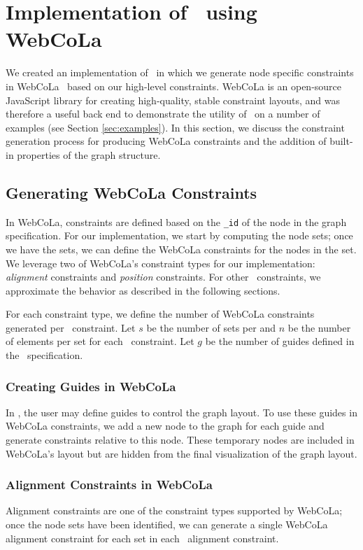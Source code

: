 \section{Implementation of \projectname~using WebCoLa}
We created an implementation of \projectname\ in which we generate node
specific constraints in WebCoLa~\cite{WebCoLa} based on our high-level
constraints. WebCoLa is an open-source JavaScript library for
creating high-quality, stable constraint layouts, and was therefore a
useful back end to demonstrate the utility of \projectname\ on a number of
examples (see Section \ref{sec:examples}). In this section, we discuss the
constraint generation process for producing WebCoLa constraints and the 
addition of built-in properties of the graph structure.

\subsection{Generating WebCoLa Constraints}
In WebCoLa, constraints are defined based on the \texttt{\_id} of the
node in the graph specification. For our implementation, we start by
computing the node sets; once we have the sets, we can define the WebCoLa
constraints for the nodes in the set. We leverage two of WebCoLa's
constraint types for our implementation: \emph{alignment} constraints 
and \emph{position} constraints. For other \projectname\ constraints, we
approximate the behavior as described in the following sections.

For each constraint type, we define the number of WebCoLa constraints
generated per \projectname\ constraint. Let $s$ be the number of sets per 
and $n$ be the number of elements per set for each \projectname\ constraint.
Let $g$ be the number of guides defined in the \projectname\ specification.

\subsubsection{Creating Guides in WebCoLa}
In \projectname, the user may define guides to control the graph layout.
To use these guides in WebCoLa constraints, we add a new node to the graph
for each guide and generate constraints relative to this node. These 
temporary nodes are included in WebCoLa's layout but are hidden from the
final visualization of the graph layout.

\subsubsection{Alignment Constraints in WebCoLa}
Alignment constraints are one of the constraint types supported by WebCoLa;
once the node sets have been identified, we can generate a single WebCoLa
alignment constraint for each set in each \projectname\ alignment constraint.

